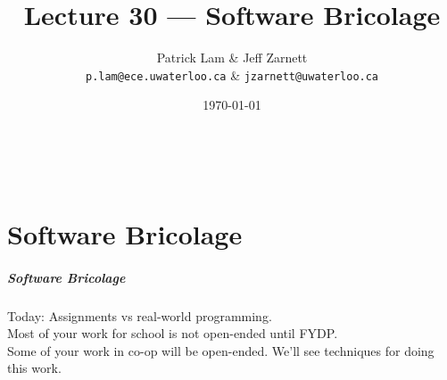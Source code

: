 

\title{Lecture 30 --- Software Bricolage}

\author{Patrick Lam \& Jeff Zarnett\\ \small \texttt{p.lam@ece.uwaterloo.ca} \& \texttt{jzarnett@uwaterloo.ca}}
\date{\today}



\begin{frame}
  \titlepage

  \vfill
  \begin{center}
    \\
                  {\tiny\CcNote{\CcLongnameByNcSa}}
                  \vspace*{-2.5ex}
  \end{center}

\end{frame}

\part{Software Bricolage}
\frame{\partpage}

\begin{frame}
\frametitle{Software Bricolage}
\begin{changemargin}{1cm}
\Large

Today: Assignments vs real-world programming.\\[1em]

Most of your work for school is not open-ended until FYDP.\\[1em]

Some of your work in co-op will be open-ended. We'll see techniques 
for doing this work.
\end{changemargin}

\end{frame}


